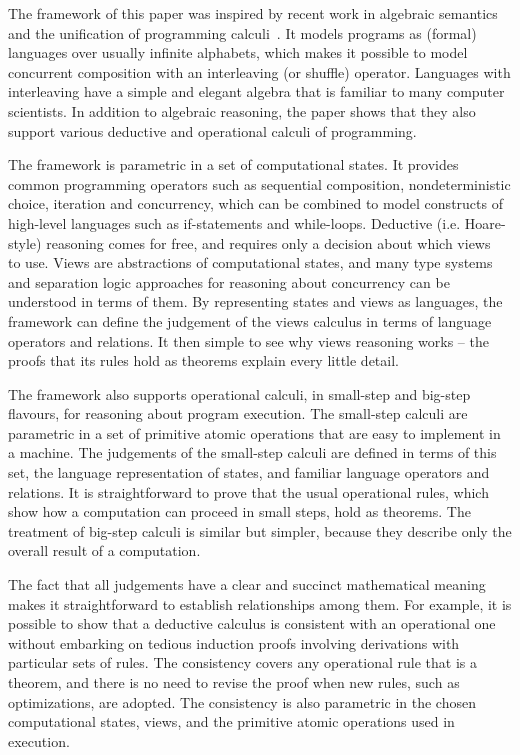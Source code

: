 \documentclass[a4paper,leqno]{llncs}
\begin{document}
The framework of this paper was inspired by recent work in algebraic semantics and the unification of programming calculi~\cite{wehrman09graphical,hoare09concurrent,hoare12laws,hoare12in,vanstaden12algebra,dinsdale-young12views}. It models programs as (formal) languages over usually infinite alphabets, which makes it possible to model concurrent composition with an interleaving (or shuffle) operator. Languages with interleaving have a simple and elegant algebra that is familiar to many computer scientists. In addition to algebraic reasoning, the paper shows that they also support various deductive and operational calculi of programming.

The framework is parametric in a set of computational states. It provides common programming operators such as sequential composition, nondeterministic choice, iteration and concurrency, which can be combined to model constructs of high-level languages such as if-statements and while-loops. Deductive (i.e. Hoare-style) reasoning comes for free, and requires only a decision about which views~\cite{dinsdale-young12views} to use. Views are abstractions of computational states, and many type systems and separation logic approaches for reasoning about concurrency can be understood in terms of them. By representing states and views as languages, the framework can define the judgement of the views calculus in terms of language operators and relations. It then simple to see why views reasoning works -- the proofs that its rules hold as theorems explain every little detail.

The framework also supports operational calculi, in small-step and big-step flavours, for reasoning about program execution. The small-step calculi are parametric in a set of primitive atomic operations that are easy to implement in a machine. The judgements of the small-step calculi are defined in terms of this set, the language representation of states, and familiar language operators and relations. It is straightforward to prove that the usual operational rules, which show how a computation can proceed in small steps, hold as theorems. The treatment of big-step calculi is similar but simpler, because they describe only the overall result of a computation.

The fact that all judgements have a clear and succinct mathematical meaning makes it straightforward to establish relationships among them. For example, it is possible to show that a deductive calculus is consistent with an operational one without embarking on tedious induction proofs involving derivations with particular sets of rules. The consistency covers any operational rule that is a theorem, and there is no need to revise the proof when new rules, such as optimizations, are adopted. The consistency is also parametric in the chosen computational states, views, and the primitive atomic operations used in execution.
\end{document}
